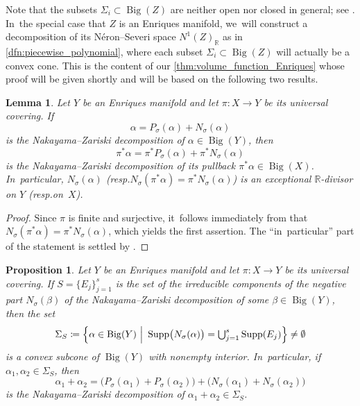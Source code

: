 \documentclass[10pt]{amsart}
\newcommand{\resp}{resp.}
\let\ts\textstyle
\theoremstyle{plain}
\newtheorem{prop}[thm]{Proposition}
\newtheorem{lem}[thm]{Lemma}
\theoremstyle{definition}
\newcommand{\R}{\mathbb{R}}
\DeclareMathOperator{\Supp}{Supp}
\DeclareMathOperator{\BgCn}{\mathrm{Big}}
\begin{document}
Note that the subsets $\Sigma_i \subset \BgCn(Z)$ are neither open nor closed in general; see \cite[Ex.\,5.1]{Denisi23}. In~the special case that $Z$ is an Enriques manifold, we~will construct a decomposition of its Néron--Severi space $N^1(Z)_\R$ as in \autoref{dfn:piecewise_polynomial},
where each subset $\Sigma_i \subset \BgCn(Z)$ will actually be a convex cone.
This is the content of our \autoref{thm:volume_function_Enriques} whose proof will be given shortly and will be based on the following two results.

\begin{lem}
\label{lem:NZD_EM_vs_IHS}
Let $Y$ be an Enriques manifold and let $\pi \colon X \to Y$ be its universal covering.
If
\[
\alpha = P_\sigma (\alpha) + N_\sigma(\alpha)
\]
is the Nakayama--Zariski decomposition of $\alpha \in \BgCn(Y)$, then
\[
\pi^* \alpha = \pi^* P_\sigma(\alpha) + \pi^* N_\sigma(\alpha)
\]
is the Nakayama--Zariski decomposition of its pullback $\pi^* \alpha \in \BgCn(X)$. In~particular, $N_\sigma(\alpha)$ (\resp $N_\sigma(\pi^*\alpha) = \pi^* N_\sigma(\alpha)$) is an exceptional $\R$\nobreakdash-divisor on $Y$ (\resp on~$X$).
\end{lem}

\begin{proof}
Since $\pi$ is finite and surjective, it~follows immediately from \cite[Th.\,III.5.16]{Nak04book} that $N_\sigma (\pi^* \alpha) = \pi^* N_\sigma(\alpha)$, which yields the first assertion. The \enquote{in~particular} part of the statement is settled by \cite[Th.\,3.12(i)]{Boucksom04}.
\end{proof}

\begin{prop}
\label{prop:BZC_EM}
Let $Y$ be an Enriques manifold and let $\pi \colon X \to Y$ be its universal covering.
If $S = \{ E_j \}_{j=1}^s $ is the set of the irreducible components of the negative part $N_\sigma(\beta)$ of the Nakayama--Zariski decomposition of some $\beta \in \BgCn(Y)$, then the set
\[\ts
\Sigma_S \coloneqq \Bigl\{ \alpha \in \BgCn(Y) \ \Big| \ \Supp \bigl(N_{\sigma}(\alpha) \bigr) = \bigcup_{j=1}^s \Supp(E_j) \Bigr\} \neq \emptyset
\]
is a convex subcone of $\BgCn(Y)$ with nonempty interior. In~particular, if $\alpha_1, \alpha_2 \in \Sigma_S$, then
\[
\alpha_1 + \alpha_2 = \bigl(P_\sigma(\alpha_1) + P_\sigma(\alpha_2) \bigr) + \bigl(N_\sigma(\alpha_1) + N_\sigma(\alpha_2) \bigr)
\]
is the Nakayama--Zariski decomposition of $\alpha_1 + \alpha_2 \in \Sigma_S$.
\end{prop}
\end{document}
